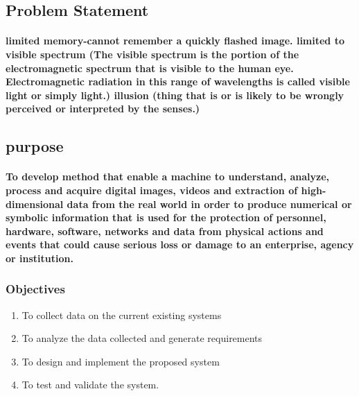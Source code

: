 \documentclass[11pt]{article}
\begin{document}
	 \subsection{\textbf{Problem Statement}}
	 
	 \paragraph{\textmd{limited memory-cannot remember a quickly flashed image. 
	 limited to visible spectrum (The visible spectrum is the portion of the electromagnetic spectrum that is visible to the human eye. Electromagnetic radiation in this range of wavelengths is called visible light or simply light.)	
	 illusion (thing that is or is likely to be wrongly perceived or interpreted by the senses.)}}
	 
	 \subsection{\textbf{purpose}}
	 
	   \paragraph{\textmd{To develop method that enable a machine to understand, analyze, process and acquire digital images, videos and extraction of high-dimensional data from the real world in order to produce numerical or symbolic information that is used for the protection of personnel, hardware, software, networks and data from physical actions and events that could cause serious loss or damage to an enterprise, agency or institution.}}
	   
	   \subsubsection{\textbf{ Objectives}}
	   
	   \begin{enumerate}
	   
	   \item To collect data on the current existing systems
	   \item To analyze the data collected and generate requirements
	   \item To design and implement the proposed system 
	   \item To test and validate the system.
	           
	   \end{enumerate} 	  
\end{document}
